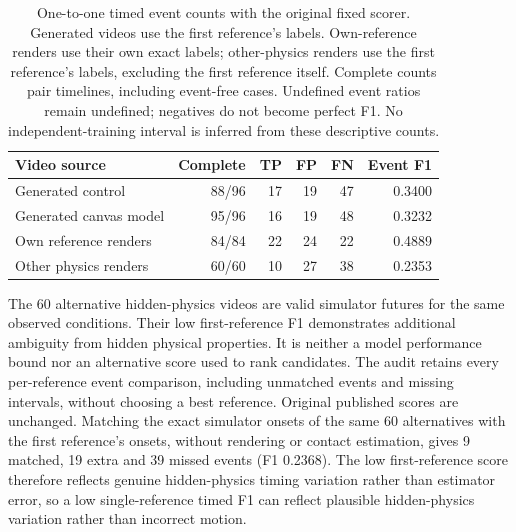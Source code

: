 \documentclass[11pt,a4paper]{article}
\begin{document}
\begin{table}[!ht]
\centering
\begin{tabular}{lrrrrr}
\hline
Video source & Complete & TP & FP & FN & Event F1 \\
\hline
Generated control & 88/96 & 17 & 19 & 47 & 0.3400 \\
Generated canvas model & 95/96 & 16 & 19 & 48 & 0.3232 \\
Own reference renders & 84/84 & 22 & 24 & 22 & 0.4889 \\
Other physics renders & 60/60 & 10 & 27 & 38 & 0.2353 \\
\hline
\end{tabular}
\caption{One-to-one timed event counts with the original fixed scorer. Generated videos use the first reference's labels. Own-reference renders use their own exact labels; other-physics renders use the first reference's labels, excluding the first reference itself. Complete counts pair timelines, including event-free cases. Undefined event ratios remain undefined; negatives do not become perfect F1. No independent-training interval is inferred from these descriptive counts.}
\label{tab:collision_calibration}
\end{table}

The 60 alternative hidden-physics videos are valid simulator futures for the same observed conditions. Their low first-reference F1 demonstrates additional ambiguity from hidden physical properties. It is neither a model performance bound nor an alternative score used to rank candidates. The audit retains every per-reference event comparison, including unmatched events and missing intervals, without choosing a best reference. Original published scores are unchanged.
Matching the exact simulator onsets of the same 60 alternatives with the first reference's onsets, without rendering or contact estimation, gives 9 matched, 19 extra and 39 missed events (F1 0.2368). The low first-reference score therefore reflects genuine hidden-physics timing variation rather than estimator error, so a low single-reference timed F1 can reflect plausible hidden-physics variation rather than incorrect motion.
\end{document}
